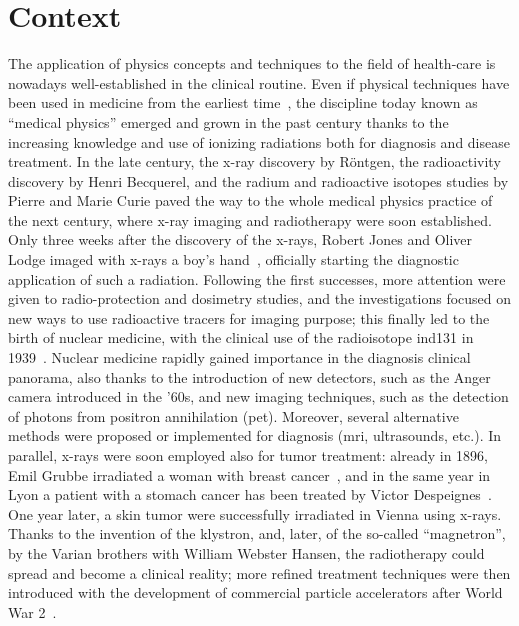 \chapter{Context}\label{chap::1}

\vfill

\minitoc

\newpage

\glsresetall

The application of physics concepts and techniques to the field of health-care is nowadays well-established in the clinical routine. Even if physical techniques have been used in medicine from the earliest time~\parencite{Duck2014}, the discipline today known as \enquote{medical physics} emerged and grown in the past century thanks to the increasing knowledge and use of ionizing radiations both for diagnosis and disease treatment. In the late  century, the x-ray discovery by R\"{o}ntgen, the radioactivity discovery by Henri Becquerel, and the radium and radioactive isotopes studies by Pierre and Marie Curie paved the way to the whole medical physics practice of the next century, where x-ray imaging and radiotherapy were soon established. Only three weeks after the discovery of the x-rays, Robert Jones and Oliver Lodge imaged with x-rays a boy's hand~\parencite{Cantor1988}, officially starting the diagnostic application of such a radiation. Following the first successes, more attention were given to radio-protection and dosimetry studies, and the investigations focused on new ways to use radioactive tracers for imaging purpose; this finally led to the birth of nuclear medicine, with the clinical use of the radioisotope \gls{ind131} in 1939~\parencite{Kereiakes1987}. Nuclear medicine rapidly gained importance in the diagnosis clinical panorama, also thanks to the introduction of new detectors, such as the Anger camera introduced in the '60s, and new imaging techniques, such as the detection of photons from positron annihilation (\gls{pet}). Moreover, several alternative methods were proposed or implemented for diagnosis (\gls{mri}, ultrasounds, etc.). In parallel, x-rays were soon employed also for tumor treatment: already in 1896, Emil Grubbe irradiated a woman with breast cancer~\parencite{Evans1951}, and in the same year in Lyon a patient with a stomach cancer has been treated by Victor Despeignes~\parencite{Despeignes1896, Foray2016}. One year later, a skin tumor were successfully irradiated in Vienna using x-rays. Thanks to the invention of the klystron, and, later, of the so-called \enquote{magnetron}, by the Varian brothers with William Webster Hansen, the radiotherapy could spread and become a clinical reality; more refined treatment techniques were then introduced with the development of commercial particle accelerators after World War 2~\parencite{Keevil2012}. 


